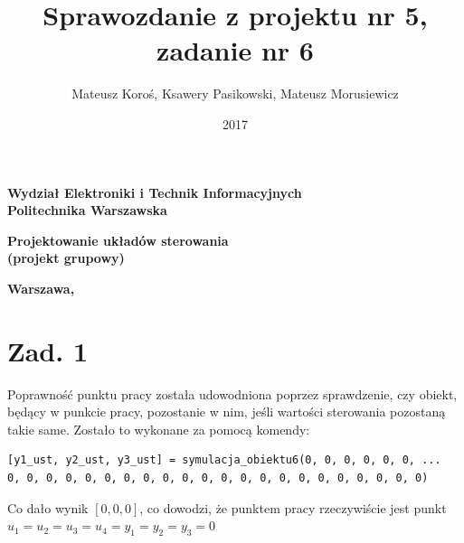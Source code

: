 \documentclass[a4paper,titlepage,11pt,twosides,floatssmall]{mwrep}
\begin{document}
\frenchspacing
\pagestyle{uheadings}

\title{\bf Sprawozdanie z projektu nr 5, zadanie nr 6\vskip 0.1cm}
\author{Mateusz Koroś, Ksawery Pasikowski, Mateusz Morusiewicz}
\date{2017}

\makeatletter
\renewcommand{\maketitle}{\begin{titlepage}
\begin{center}{\LARGE {\bf
Wydział Elektroniki i Technik Informacyjnych}}\\
\vspace{0.4cm}
{\LARGE {\bf Politechnika Warszawska}}\\
\vspace{0.3cm}
\end{center}
\vspace{5cm}
\begin{center}
{\bf \LARGE Projektowanie układów sterowania\\ (projekt grupowy) \vskip 0.1cm}
\end{center}
\vspace{1cm}
\begin{center}
{\bf \LARGE \@title}
\end{center}
\vspace{2cm}
\begin{center}
{\bf \Large \@author \par}
\end{center}
\vspace*{\stretch{6}}
\begin{center}
\bf{\large{Warszawa, \@date\vskip 0.1cm}}
\end{center}
\end{titlepage}
}
\makeatother

\maketitle
\tableofcontents
\chapter*{Zad. 1}
Poprawność punktu pracy została udowodniona poprzez sprawdzenie, czy obiekt, będący w punkcie pracy, pozostanie w nim, jeśli wartości sterowania pozostaną takie same. Zostało to wykonane za pomocą komendy:
\begin{lstlisting}[style=Matlab-editor]
[y1_ust, y2_ust, y3_ust] = symulacja_obiektu6(0, 0, 0, 0, 0, 0, ...
0, 0, 0, 0, 0, 0, 0, 0, 0, 0, 0, 0, 0, 0, 0, 0, 0, 0, 0, 0, 0, 0)
\end{lstlisting}
Co dało wynik $ [0, 0, 0] $, co dowodzi, że punktem pracy rzeczywiście jest punkt $u_{1}=u_{2}=u_{3}=u_{4}=y_{1}=y_{2}=y_{3}=0$
\end{document}
